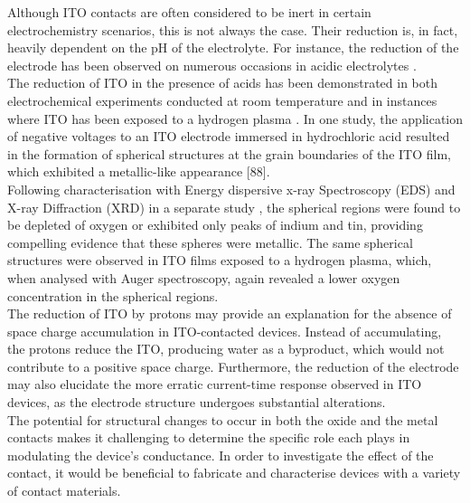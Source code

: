 \noindent Although ITO contacts are often considered to be inert in certain electrochemistry scenarios, this is not always the case. Their reduction is, in fact, heavily dependent on the pH of the electrolyte. For instance, the reduction of the electrode has been observed on numerous occasions in acidic electrolytes \cite{ciocci2021differentiating,senthilkumar2008electrochemical}. \\

\noindent The reduction of ITO in the presence of acids has been demonstrated in both electrochemical experiments conducted at room temperature \cite{wang2003optical} and in instances where ITO has been exposed to a hydrogen plasma \cite{banerjee1987degradation}. In one study, the application of negative voltages to an ITO electrode immersed in hydrochloric acid resulted in the formation of spherical structures at the grain boundaries of the ITO film, which exhibited a metallic-like appearance [88]. \\

\noindent Following characterisation with Energy dispersive x-ray Spectroscopy (EDS) \cite{huang2003electrochemical} and X-ray Diffraction (XRD) in a separate study \cite{liu2015important}, the spherical regions were found to be depleted of oxygen or exhibited only peaks of indium and tin, providing compelling evidence that these spheres were metallic. The same spherical structures were observed in ITO films exposed to a hydrogen plasma, which, when analysed with Auger spectroscopy, again revealed a lower oxygen concentration in the spherical regions.\\

\noindent The reduction of ITO by protons may provide an explanation for the absence of space charge accumulation in ITO-contacted devices. Instead of accumulating, the protons reduce the ITO, producing water as a byproduct, which would not contribute to a positive space charge. Furthermore, the reduction of the electrode may also elucidate the more erratic current-time response observed in ITO devices, as the electrode structure undergoes substantial alterations.\\

\noindent The potential for structural changes to occur in both the oxide and the metal contacts makes it challenging to determine the specific role each plays in modulating the device's conductance. In order to investigate the effect of the contact, it would be beneficial to fabricate and characterise devices with a variety of contact materials. \\

